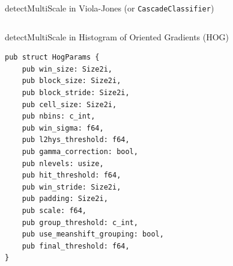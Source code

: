 \begin{frame}{detectMultiScale in Viola-Jones (or \texttt{CascadeClassifier})}
\begin{columns}
  \end{columns}
\end{frame}

\begin{frame}[fragile]{detectMultiScale in Histogram of Oriented Gradients (HOG)}
  \vspace{1em}
  \centering
\begin{Verbatim}[fontsize=\scriptsize]
pub struct HogParams {
    pub win_size: Size2i,
    pub block_size: Size2i,
    pub block_stride: Size2i,
    pub cell_size: Size2i,
    pub nbins: c_int,
    pub win_sigma: f64,
    pub l2hys_threshold: f64,
    pub gamma_correction: bool,
    pub nlevels: usize,
    pub hit_threshold: f64,
    pub win_stride: Size2i,
    pub padding: Size2i,
    pub scale: f64,
    pub group_threshold: c_int,
    pub use_meanshift_grouping: bool,
    pub final_threshold: f64,
}
\end{Verbatim}
\end{frame}

